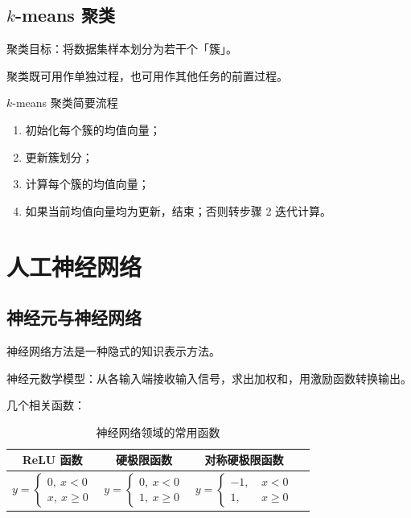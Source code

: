 \documentclass[UTF8]{ctexart}
\begin{document}
\subsection{$k$-means 聚类}
聚类目标：将数据集样本划分为若干个「簇」。

聚类既可用作单独过程，也可用作其他任务的前置过程。

\begin{process}{$k$-means 聚类简要流程}
\begin{enumerate}[itemsep=0pt,parsep=0pt]
  \item 初始化每个簇的均值向量；
  \item 更新簇划分；
  \item 计算每个簇的均值向量；
  \item 如果当前均值向量均为更新，结束；否则转步骤 2 迭代计算。
\end{enumerate}
\end{process}

\section{人工神经网络}
\subsection{神经元与神经网络}
神经网络方法是一种隐式的知识表示方法。

神经元数学模型：从各输入端接收输入信号，求出加权和，用激励函数转换输出。

几个相关函数：
\begin{table}[htb]
  \centering
  \begin{tabular}{cccc}
  \toprule
    ReLU 函数 & 硬极限函数 & 对称硬极限函数 \\
  \midrule
    $y = \begin{cases} 0, \ x<0 \\ x,\ x\geqslant 0\end{cases}$ &
    $y = \begin{cases} 0, \ x<0 \\ 1,\ x\geqslant 0\end{cases}$ &
    $y = \begin{cases} -1, \ & x<0 \\ 1,\ & x\geqslant 0\end{cases}$ \\
  \bottomrule
  \end{tabular}
  \caption{神经网络领域的常用函数}\label{fig:func}
\end{table}
\end{document}
